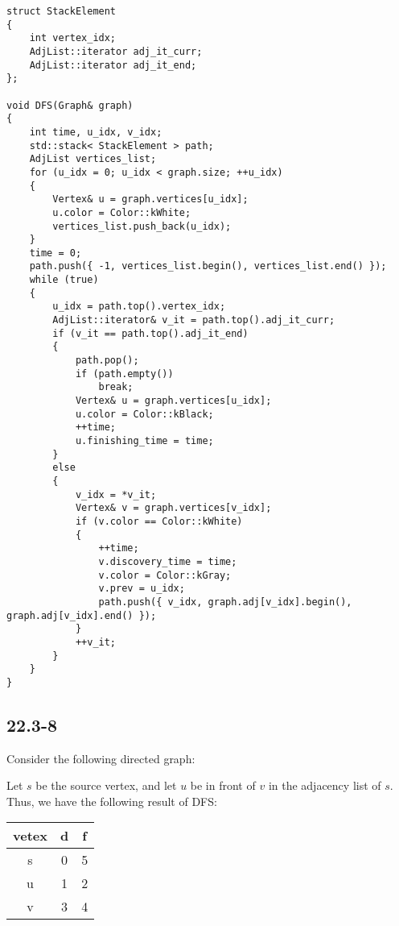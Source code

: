 \begin{verbatim}
struct StackElement
{
    int vertex_idx;
    AdjList::iterator adj_it_curr;
    AdjList::iterator adj_it_end;
};

void DFS(Graph& graph)
{
    int time, u_idx, v_idx;
    std::stack< StackElement > path;
    AdjList vertices_list;
    for (u_idx = 0; u_idx < graph.size; ++u_idx)
    {
        Vertex& u = graph.vertices[u_idx];
        u.color = Color::kWhite;
        vertices_list.push_back(u_idx);
    }
    time = 0;
    path.push({ -1, vertices_list.begin(), vertices_list.end() });
    while (true)
    {
        u_idx = path.top().vertex_idx;
        AdjList::iterator& v_it = path.top().adj_it_curr;
        if (v_it == path.top().adj_it_end)
        {
            path.pop();
            if (path.empty())
                break;
            Vertex& u = graph.vertices[u_idx];
            u.color = Color::kBlack;
            ++time;
            u.finishing_time = time;
        }
        else
        {
            v_idx = *v_it;
            Vertex& v = graph.vertices[v_idx];
            if (v.color == Color::kWhite)
            {
                ++time;
                v.discovery_time = time;
                v.color = Color::kGray;
                v.prev = u_idx;
                path.push({ v_idx, graph.adj[v_idx].begin(), graph.adj[v_idx].end() });
            }
            ++v_it;
        }
    }
}
\end{verbatim}

\subsection*{22.3-8}

Consider the following directed graph:


Let $s$ be the source vertex,
and let $u$ be in front of $v$ in the adjacency list of $s$.
Thus, we have the following result of DFS:

\begin{tabular}{c|c|c}
    vetex & d & f \\
    \hline
    s & 0 & 5 \\
    u & 1 & 2 \\
    v & 3 & 4
\end{tabular}

